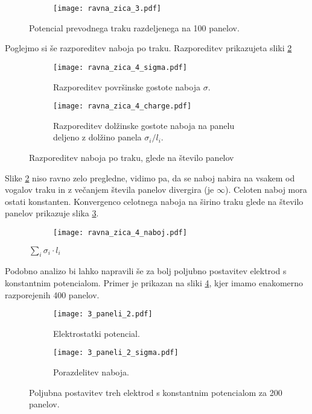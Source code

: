 \documentclass[12pt,a4paper]{article}
\begin{document}
\begin{figure}[H]
    \centering
    \begin{subfigure}[b]{0.5\textwidth}  			
        \texttt{[image: ravna\_zica\_3.pdf]}
    \end{subfigure}
    \caption{Potencial prevodnega traku razdeljenega na 100 panelov.} \label{fig:slika4}
\end{figure}

\noindent Poglejmo si še razporeditev naboja po traku. Razporeditev prikazujeta sliki \ref{fig:slika5}

\begin{figure}[H]
    \centering
    \begin{subfigure}[b]{0.45\textwidth}  			
        \texttt{[image: ravna\_zica\_4\_sigma.pdf]}
        \caption{Razporeditev površinske gostote naboja $\sigma$.}
    \end{subfigure}
    \begin{subfigure}[b]{0.45\textwidth}  			
        \texttt{[image: ravna\_zica\_4\_charge.pdf]}
        \caption{Razporeditev dolžinske gostote naboja na panelu deljeno z dolžino panela $\sigma_i / l_i$.}
    \end{subfigure}
    \caption{Razporeditev naboja po traku, glede na število panelov} \label{fig:slika5}
\end{figure}
\noindent Slike \ref{fig:slika5} niso ravno zelo pregledne, vidimo pa, da se naboj nabira na vsakem od vogalov traku in z večanjem števila panelov divergira (je  $\infty$). Celoten naboj mora ostati konstanten. Konvergenco celotnega naboja na širino traku glede na število panelov prikazuje slika \ref{fig:slika6}.

\begin{figure}[H]
    \centering
    \begin{subfigure}[b]{0.5\textwidth}  			
        \texttt{[image: ravna\_zica\_4\_naboj.pdf]}
    \end{subfigure}
    \caption{$\sum _i \sigma _i  \cdot l_i$} \label{fig:slika6}
\end{figure}

Podobno analizo bi lahko napravili še za bolj poljubno postavitev elektrod s konstantnim potencialom. Primer je prikazan na sliki \ref{fig:slika7}, kjer imamo enakomerno razporejenih 400 panelov.

\begin{figure}[H]
    \centering
    \begin{subfigure}[b]{0.45\textwidth}  			
        \texttt{[image: 3\_paneli\_2.pdf]}
        \caption{Elektrostatki potencial.}
    \end{subfigure}
    \begin{subfigure}[b]{0.45\textwidth}  			
        \texttt{[image: 3\_paneli\_2\_sigma.pdf]}
        \caption{Porazdelitev naboja.}
    \end{subfigure}
    \caption{Poljubna postavitev treh elektrod s konstantnim potencialom za 200 panelov.} \label{fig:slika7}
\end{figure}
\end{document}
